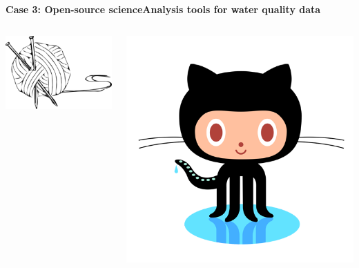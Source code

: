 \documentclass[serif]{beamer}\usepackage[]{graphicx}\usepackage[]{color}
\begin{document}
\begin{frame}{\textbf{Case 3: Open-source science}}{\textbf{Analysis tools for water quality data}}
\begin{columns}
\begin{column}{0.25\textwidth}
\centerline{\includegraphics[width = \textwidth]{fig/knit-logo.png}}
\end{column}
\begin{column}{0.25\textwidth}
\centerline{\includegraphics[width = \textwidth]{fig/octocat.png}}
\end{column}
\end{columns}
\end{frame}
\end{document}
